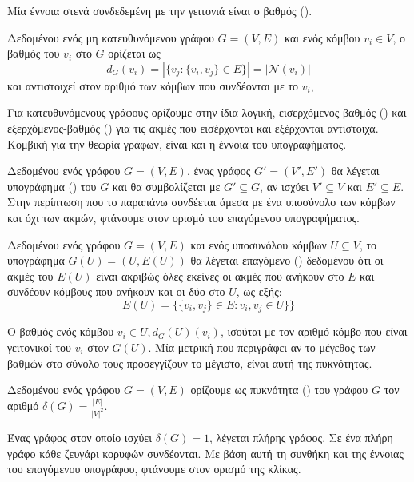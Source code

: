 Μία έννοια στενά συνδεδεμένη με την γειτονιά είναι ο βαθμός ().
\begin{definition}[Βαθμός]
Δεδομένου ενός μη κατευθυνόμενου γράφου $G = ( V, E )$ και ενός κόμβου $v_{i} \in V$, ο βαθμός του $v_{i}$ στο $G$ ορίζεται ως $$d_{G} ( v_{i} ) = |\{ v_{j} : \{ v_{i} , v_{j} \} \in E \}| = |\mathcal{N} ( v_{i} )|$$ και αντιστοιχεί στον αριθμό των κόμβων που συνδέονται με το $v_{i}$,
\end{definition}
Για κατευθυνόμενους γράφους ορίζουμε στην ίδια λογική, εισερχόμενος-βαθμός () και εξερχόμενος-βαθμός () για τις ακμές που εισέρχονται και εξέρχονται αντίστοιχα.
Κομβική για την θεωρία γράφων, είναι και η έννοια του υπογραφήματος.
\begin{definition}[Υπογράφημα]
Δεδομένου ενός γράφου $G = ( V, E )$, ένας γράφος $G' = ( V', E')$ θα λέγεται υπογράφημα () του $G$ και θα συμβολίζεται με $G' \subseteq G$, αν ισχύει $V' \subseteq V$ και $E' \subseteq E$.
\label{def:subgraph}
Στην περίπτωση που το παραπάνω συνδέεται άμεσα με ένα υποσύνολο των κόμβων και όχι των ακμών, φτάνουμε στον ορισμό του επαγόμενου υπογραφήματος.
\end{definition}
\begin{definition}
Δεδομένου ενός γράφου $G = ( V, E )$ και ενός υποσυνόλου κόμβων $U \subseteq V$, το υπογράφημα $G(U) = (U, E(U))$ θα λέγεται επαγόμενο () δεδομένου ότι οι ακμές του $E(U)$ είναι ακριβώς όλες εκείνες οι ακμές που ανήκουν στο $E$ και συνδέουν κόμβους που ανήκουν και οι δύο στο $U$, ως εξής:
\begin{equation}
    E(U) = \{\{v_{i},v_{j}\}\in E: v_{i}, v_{j}\in U\}\}
\end{equation}
\label{def:induced_subgraph}
\end{definition}
Ο βαθμός ενός κόμβου $v_{i} \in U, d_{G}(U)(v_{i})$, ισούται με τον αριθμό κόμβο που είναι γειτονικοί του $v_{i}$ στον $G(U)$.
Μία μετρική που περιγράφει αν το μέγεθος των βαθμών στο σύνολο τους προσεγγίζουν το μέγιστο, είναι αυτή της πυκνότητας.
\begin{definition}[Πυκνότητα]
Δεδομένου ενός γράφου $G = ( V, E )$ ορίζουμε ως πυκνότητα () του γράφου $G$ τον αριθμό $\delta(G) = \frac{|E|}{|V|^{2}}$.
\end{definition}
Ένας γράφος στον οποίο ισχύει $\delta(G) = 1$, λέγεται πλήρης γράφος.
Σε ένα πλήρη γράφο κάθε ζευγάρι κορυφών συνδέονται.
Με βάση αυτή τη συνθήκη και της έννοιας του επαγόμενου υπογράφου, φτάνουμε στον ορισμό της κλίκας.
